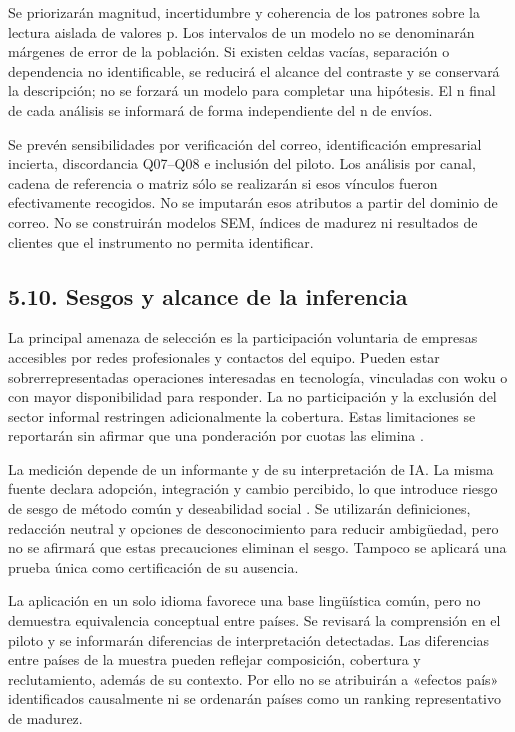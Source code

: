 \documentclass[12pt,letterpaper]{article}
\begin{document}
Se priorizarán magnitud, incertidumbre y coherencia de los patrones sobre la lectura aislada de valores p. Los intervalos de un modelo no se denominarán márgenes de error de la población. Si existen celdas vacías, separación o dependencia no identificable, se reducirá el alcance del contraste y se conservará la descripción; no se forzará un modelo para completar una hipótesis. El n final de cada análisis se informará de forma independiente del n de envíos.

Se prevén sensibilidades por verificación del correo, identificación empresarial incierta, discordancia Q07--Q08 e inclusión del piloto. Los análisis por canal, cadena de referencia o matriz sólo se realizarán si esos vínculos fueron efectivamente recogidos. No se imputarán esos atributos a partir del dominio de correo. No se construirán modelos SEM, índices de madurez ni resultados de clientes que el instrumento no permita identificar.

\subsection*{5.10. Sesgos y alcance de la inferencia}
La principal amenaza de selección es la participación voluntaria de empresas accesibles por redes profesionales y contactos del equipo. Pueden estar sobrerrepresentadas operaciones interesadas en tecnología, vinculadas con woku o con mayor disponibilidad para responder. La no participación y la exclusión del sector informal restringen adicionalmente la cobertura. Estas limitaciones se reportarán sin afirmar que una ponderación por cuotas las elimina \citep{baker}.

La medición depende de un informante y de su interpretación de IA. La misma fuente declara adopción, integración y cambio percibido, lo que introduce riesgo de sesgo de método común y deseabilidad social \citep{pods}. Se utilizarán definiciones, redacción neutral y opciones de desconocimiento para reducir ambigüedad, pero no se afirmará que estas precauciones eliminan el sesgo. Tampoco se aplicará una prueba única como certificación de su ausencia.

La aplicación en un solo idioma favorece una base lingüística común, pero no demuestra equivalencia conceptual entre países. Se revisará la comprensión en el piloto y se informarán diferencias de interpretación detectadas. Las diferencias entre países de la muestra pueden reflejar composición, cobertura y reclutamiento, además de su contexto. Por ello no se atribuirán a «efectos país» identificados causalmente ni se ordenarán países como un ranking representativo de madurez.
\end{document}
